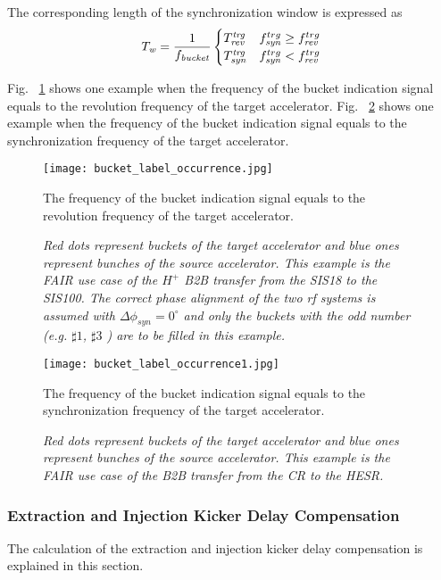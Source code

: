 The corresponding length of the synchronization window is expressed as
\begin{eqnarray}
T_\mathit{w}=\frac{1}{f_\mathit{bucket}}
\begin{cases}
T_\mathit{rev}^\mathit{trg} &f_{\mathit{syn}}^{trg}\ge f_{\mathit{rev}}^{trg}\cr

T_\mathit{syn}^\mathit{trg}
&f_{\mathit{syn}}^{trg}<f_{\mathit{rev}}^{trg}
\end{cases}
\end{eqnarray}


Fig. ~\ref{bucket_label_occurrence} shows one example when the frequency of the bucket indication signal equals to the revolution frequency of the target accelerator. Fig. ~\ref{bucket_label_occurrence1} shows one example when the frequency of the bucket indication signal equals to the synchronization frequency of the target accelerator. 
\begin{figure}[!htb]
   \centering   
   \texttt{[image: bucket\_label\_occurrence.jpg]}
   \caption{The frequency of the bucket indication signal equals to the revolution frequency of the target accelerator.}
	\caption*{\textsl{\small{Red dots represent buckets of the target accelerator and blue ones represent bunches of the source accelerator. This example is the FAIR use case of the $H^+$ B2B transfer from the SIS18 to the SIS100. The correct phase alignment of the two rf systems is assumed with $\Delta\phi_\mathit{syn}=0^\circ$ and only the buckets with the odd number (e.g. $\sharp1$, $\sharp3$ ) are to be filled in this example.}}}
   \label{bucket_label_occurrence}
\end{figure}

\begin{figure}[!htb]
   \centering   
   \texttt{[image: bucket\_label\_occurrence1.jpg]}
   \caption{The frequency of the bucket indication signal equals to the synchronization frequency of the target accelerator.}
	\caption*{\textsl{\small{Red dots represent buckets of the target accelerator and blue ones represent bunches of the source accelerator. This example is the FAIR use case of the B2B transfer from the CR to the HESR. }}}
   \label{bucket_label_occurrence1}
\end{figure}



\subsubsection{Extraction and Injection Kicker Delay Compensation}
The calculation of the extraction and injection kicker delay compensation is explained in this section.

